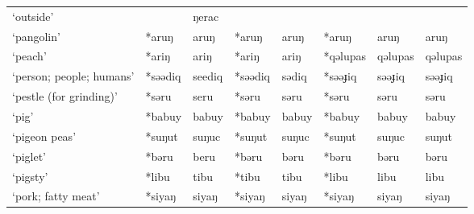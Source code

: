 \begin{landscape}
\begin{longtable}[c]{@{}p{3cm}<{\raggedright}p{2.75cm}<{\raggedright}p{2.75cm}<{\raggedright}p{2.75cm}<{\raggedright}p{2.75cm}<{\raggedright}p{2.75cm}<{\raggedright}p{2.75cm}<{\raggedright}p{2.75cm}<{\raggedright}@{}}
`outside'                                            &              & ŋerac                          &                    &                            &                  &                          &                                   \\
`pangolin'                                           & *aruŋ              & aruŋ                           & *aruŋ              & aruŋ                       & *aruŋ            & aruŋ                     & aruŋ                              \\
`peach'                                              & *ariŋ              & ariŋ                           & *ariŋ              & ariŋ                       & *qəlupas         & qəlupas                  & qəlupas                           \\
`person; people; humans'                             & *səədiq            & seediq                         & *səədiq            & sədiq                      & *səəɟiq          & səəɟiq                   & səəɟiq                            \\
`pestle (for grinding)'                              & *səru              & seru                           & *səru              & səru                       & *səru            & səru                     & səru                              \\
`pig'                                                & *babuy             & babuy                          & *babuy             & babuy                      & *babuy           & babuy                    & babuy                             \\
`pigeon peas'                                        & *suŋut             & suŋuc                          & *suŋut             & suŋuc                      & *suŋut           & suŋuc                    & suŋut                             \\
`piglet'                                             & *bəru              & beru                           & *bəru              & bəru                       & *bəru            & bəru                     & bəru                              \\
`pigsty'                                             & *libu           & tibu                           & *tibu              & tibu                       & *libu            & libu                     & libu                              \\
`pork; fatty meat'                                   & *siyaŋ             & siyaŋ                          & *siyaŋ             & siyaŋ                      & *siyaŋ           & siyaŋ                    & siyaŋ                             \\

\end{longtable}
\end{landscape}
